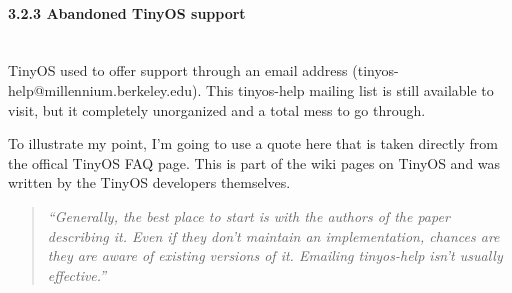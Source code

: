 \paragraph{3.2.3 Abandoned TinyOS
support\\\\}\label{abandoned-tinyos-support}

TinyOS used to offer support through an email address
(tinyos-help@millennium.berkeley.edu). This tinyos-help mailing list is
still available to visit, but it completely unorganized and a total mess
to go through.

To illustrate my point, I'm going to use a quote here that is taken
directly from the offical TinyOS FAQ page. This is part of the wiki
pages on TinyOS and was written by the TinyOS developers themselves.

\begin{quote}
\emph{``Generally, the best place to start is with the authors of the
paper describing it. Even if they don't maintain an implementation,
chances are they are aware of existing versions of it. Emailing
tinyos-help isn't usually effective.''}\cite{tinyfaq}
\end{quote}
